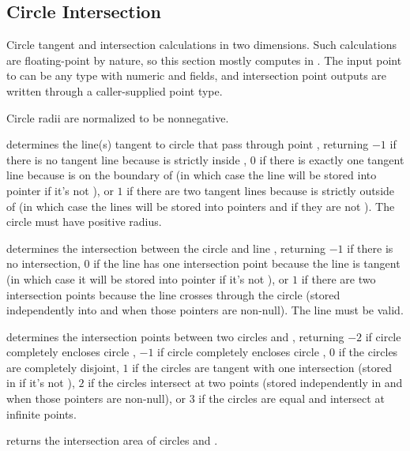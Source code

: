 \subsection{Circle Intersection}
\label{sec:7.2.4}
Circle tangent and intersection calculations in two dimensions. Such calculations are floating-point by nature, so this section mostly computes in . The input point  to  can be any type with numeric  and  fields, and intersection point outputs are written through a caller-supplied point type.

Circle radii are normalized to be nonnegative.

\begin{compactitem}
  \item {} determines the line(s) tangent to circle  that pass through point , returning $-1$ if there is no tangent line because  is strictly inside , $0$ if there is exactly one tangent line because  is on the boundary of  (in which case the line will be stored into pointer  if it's not ), or $1$ if there are two tangent lines because  is strictly outside of  (in which case the lines will be stored into pointers  and  if they are not ). The circle must have positive radius.
  \item {} determines the intersection between the circle  and line , returning $-1$ if there is no intersection, $0$ if the line has one intersection point because the line is tangent (in which case it will be stored into pointer  if it's not ), or $1$ if there are two intersection points because the line crosses through the circle (stored independently into  and  when those pointers are non-null). The line must be valid.
  \item {} determines the intersection points between two circles  and , returning $-2$ if circle  completely encloses circle , $-1$ if circle  completely encloses circle , $0$ if the circles are completely disjoint, $1$ if the circles are tangent with one intersection (stored in  if it's not ), $2$ if the circles intersect at two points (stored independently in  and  when those pointers are non-null), or $3$ if the circles are equal and intersect at infinite points.
  \item {} returns the intersection area of circles  and .
\end{compactitem}


